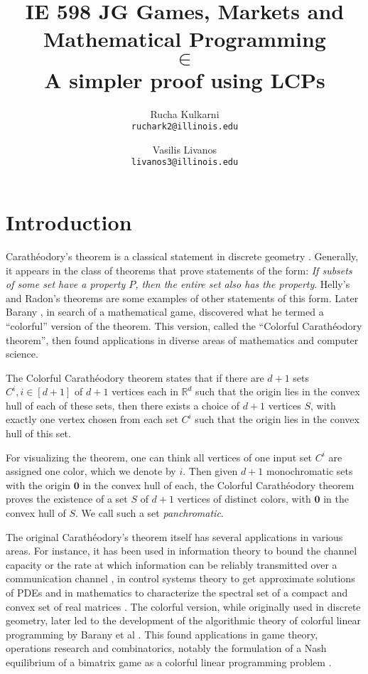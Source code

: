 \documentclass[a4paper,11pt]{article}
\title{IE 598 JG Games, Markets and Mathematical Programming \\ \CCP $\in$ \PPAD \\ A simpler proof using LCPs}
\author{
	{\sc Rucha Kulkarni} \\
	\texttt{ruchark2@illinois.edu}
	\and
	{\sc Vasilis Livanos} \\
	\texttt{livanos3@illinois.edu}
}
\date{}
\def\CC{Colorful Carath\'eodory }
\def\C{Carath\'eodory}
\def\org{\bm{0}}
\begin{document}
 \maketitle

\section{Introduction}

\par \C's theorem is a classical statement in discrete geometry \cite{CP07}. Generally, it appears in the class of theorems that prove statements of the form: \textit{If subsets of some set have a property $P$, then the entire set also has the property}. Helly's and Radon's theorems are some examples of other statements of this form. Later Barany \cite{IB}, in search of a mathematical game, discovered what he termed a ``colorful'' version of the theorem. This version, called the ``\CC theorem'', then found applications in diverse areas of mathematics and computer science. 

\par The \CC theorem states that if there are $d+1$ sets $C^i, i \in [d+1]$ of $d+1$ vertices each in $\mathbb{R}^d$ such that the origin lies in the convex hull of each of these sets, then there exists a choice of $d+1$ vertices $S$, with exactly one vertex chosen from each set $C^i$ such that the origin lies in the convex hull of this set.

\par For visualizing the theorem, one can think all vertices of one input set $C^i$ are assigned one color,
which we denote by $i$. Then given $d+1$ monochromatic sets with the origin $\org$ in the convex hull of each, the
\CC theorem proves the existence of a set $S$ of $d+1$ vertices of distinct colors, with $\org$ in the convex
hull of $S$. We call such a set \textit{panchromatic}.

\par The original \C's theorem itself has several applications in various areas. For instance, it has been used in information theory to bound the channel capacity or the rate at which information can be reliably transmitted over a communication channel \cite{CP_App1}, in control systems theory to get approximate solutions of PDEs \cite{CP_App3} and in mathematics to characterize the spectral set of a compact and convex set of real matrices \cite{CP_App2}. The colorful version, while originally used in discrete geometry, later led to the development of the algorithmic theory of colorful linear programming by Barany et al \cite{CCP_Apps}. This found applications in game theory, operations research and combinatorics, notably the formulation of a Nash equilibrium of a bimatrix game as a colorful linear programming problem \cite{CCP_Apps}.
\end{document}
